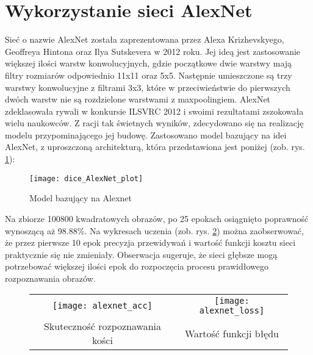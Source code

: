 \section{Wykorzystanie sieci AlexNet}
Sieć o nazwie AlexNet \cite{AlexNetNVIDIA, AlexNetpresentation} została
zaprezentowana przez Alexa Krizhevskyego, Geoffreya Hintona oraz Ilya Sutskevera w 2012 roku.
Jej ideą jest zastosowanie większej ilości warstw konwolucyjnych, gdzie początkowe dwie warstwy
mają filtry rozmiarów odpowiednio 11x11 oraz 5x5. Następnie umieszczone są trzy warstwy
konwolucyjne z filtrami 3x3, które w przeciwieństwie do pierwszych
dwóch warstw nie są rozdzielone warstwami z maxpoolingiem. AlexNet zdeklasowała rywali
w konkursie ILSVRC 2012 i swoimi rezultatami zszokowała wielu naukowców. Z racji tak świetnych
wyników, zdecydowano się na realizację modelu przypominającego jej budowę.
Zastosowano model bazujący na idei AlexNet, z uproszczoną architekturą, która przedstawiona jest poniżej (zob. rys. \ref{fig:alexnet}):
\newpage
\begin{figure}[h!]
\centering
\texttt{[image: dice\_AlexNet\_plot]}
\caption{Model bazujący na Alexnet}
\label{fig:alexnet}
\end{figure}
Na zbiorze 100800 kwadratowych obrazów, po 25 epokach osiągnięto poprawność wynoszącą aż 98.88\%.
Na wykresach uczenia (zob. rys. \ref{fig:alexnet_plot}) można zaobserwować, że przez pierwsze 10 epok precyzja przewidywań
i wartość funkcji kosztu sieci praktycznie się nie zmieniały. Obserwacja sugeruje, że sieci
głębsze mogą potrzebować większej ilości epok do rozpoczęcia procesu prawidłowego rozpoznawania obrazów.\\
\begin{figure}[h!]
\begin{center}
\begin{tabular}{cc}
\texttt{[image: alexnet\_acc]} &
\texttt{[image: alexnet\_loss]} \\
 Skuteczność rozpoznawania kości & Wartość funkcji błędu\\
\end{tabular}
\label{fig:alexnet_plot}
\end{center}
\end{figure}\\

